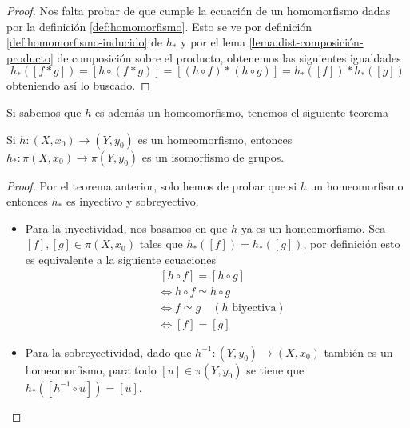 {\begin{proof}
  Nos falta probar de que cumple la
  ecuación de un homomorfismo dadas por la definición
  \ref{def:homomorfismo}. Esto se ve por definición
  \ref{def:homomorfismo-inducido} de \(h_*\) y por el
  lema \ref{lema:dist-composición-producto} de composición sobre el
  producto, obtenemos las siguientes igualdades
  \[
    h_{*} ([f * g])
    = [h \circ (f * g)]
    = [(h \circ f) * (h \circ g)]
    = h_{*} ([f]) * h_{*} ([g])
  \]
  obteniendo así lo buscado.
\end{proof}
Si sabemos que \(h\) es además un homeomorfismo, tenemos el siguiente
teorema
\begin{teorema} \label{thm:homoemorfismo-isomorfismo}
Si \(h : (X, x_0) \to (Y,y_0)\) es un homeomorfismo, entonces \(h_{*} :
\pi (X, x_0) \to \pi (Y, y_0)\) es un isomorfismo de grupos.
\end{teorema}
\begin{proof}
Por el teorema anterior, solo hemos de probar que si \(h\) un
homeomorfismo entonces \(h_*\) es inyectivo y sobreyectivo.
\begin{itemize}
  \item Para la inyectividad, nos basamos en que \(h\) ya es un
  homeomorfismo. Sea \([f], [g] \in \pi (X, x_0)\) tales que \(h_* ([f])
  = h_* ([g])\), por definición esto es equivalente a la siguiente
  ecuaciones
  \begin{align*}
    &~ [h \circ f] = [h \circ g] \\
    &\iff h \circ f \simeq h \circ g \\
    &\iff f \simeq g \quad (h \text{ biyectiva}) \\
    &\iff [f] = [g]
  \end{align*}

  \item Para la sobreyectividad, dado que \(h^{-1} :
  (Y,y_0) \to (X, x_0)\) también es un homeomorfismo, para todo \([u] \in
  \pi (Y, y_0) \) se tiene que \(h_{*} ([h^{-1} \circ u]) = [u]\).
\end{itemize}
\end{proof}

}
